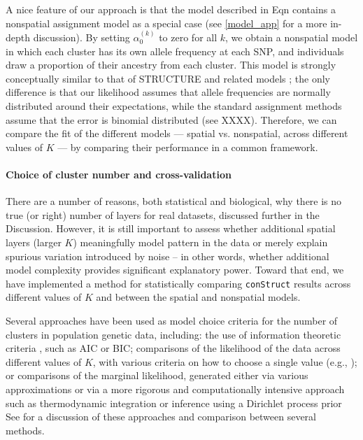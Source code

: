 \documentclass[12pt]{article}
\begin{document}
A nice feature of our approach is that the model described in Eqn  
contains a nonspatial assignment model as a special case 
(see \ref{model_app} for a more in-depth discussion). 
By setting $\alpha_0^{(k)}$ to zero for all $k$, 
we obtain a nonspatial model in which each cluster has its own allele frequency at each SNP, 
and individuals draw a proportion of their ancestry from each cluster. 
This model is strongly conceptually similar to that of STRUCTURE \citep{STRUCTURE} 
and related models \citep[e.g.][]{ADMIXTURE}; 
the only difference is that our likelihood assumes that allele frequencies are normally distributed 
around their expectations, 
while the standard assignment methods assume that the error is binomial distributed (see XXXX).  
Therefore, we can compare the fit of the different models 
--- spatial vs. nonspatial, across different values of $K$ --- 
by comparing their performance in a common framework.

\paragraph{Choice of cluster number and cross-validation}
There are a number of reasons, both statistical and biological, 
why there is no true (or right) number of layers for real datasets,
discussed further in the Discussion.
However, it is still important to assess whether additional spatial layers (larger $K$)
meaningfully model pattern in the data
or merely explain spurious variation introduced by noise
-- in other words, whether additional model complexity
provides significant explanatory power.
Toward that end, we have implemented a method for 
statistically comparing \texttt{conStruct} results across different values of $K$ 
and between the spatial and nonspatial models.

Several approaches have been used as model choice criteria 
for the number of clusters in population genetic data, including: 
the use of information theoretic criteria \citep[e.g.][]{ADMIXTURE}, such as AIC or BIC;
comparisons of the likelihood of the data across different values of $K$, 
with various criteria on how to choose a single value (e.g., \citep{Evanno2005});
or comparisons of the marginal likelihood, 
generated either via various approximations \citep[e.g.][]{STRUCTURE}
or via a more rigorous and computationally intensive approach such as thermodynamic integration \citep{verity_nichols2016}
or inference using a Dirichlet process prior \citep{huelsenbeck2007inference}
See \cite{verity_nichols2016} for a discussion of these approaches and comparison
between several methods.
\end{document}
